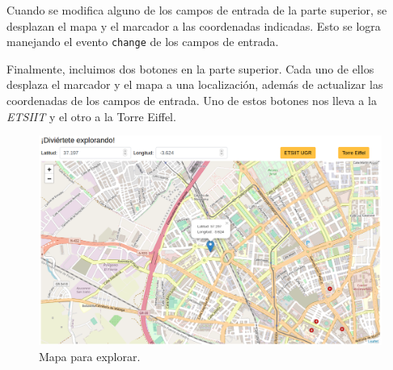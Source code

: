 \documentclass{article}
\begin{document}
Cuando se modifica alguno de los campos de entrada de la parte
superior, se desplazan el mapa y el marcador a las coordenadas
indicadas. Esto se logra manejando el evento \texttt{change} de los
campos de entrada.

Finalmente, incluimos dos botones en la parte superior. Cada uno de
ellos desplaza el marcador y el mapa a una localización, además de
actualizar las coordenadas de los campos de entrada. Uno de estos
botones nos lleva a la \textit{ETSIIT} y el otro a la Torre Eiffel.

\begin{figure}[H]
  \centering
  \includegraphics[width=180mm]{imgs/map-explore}
  \caption{Mapa para explorar.}
  \label{fig:map-explore}
\end{figure}
  
\end{document}
